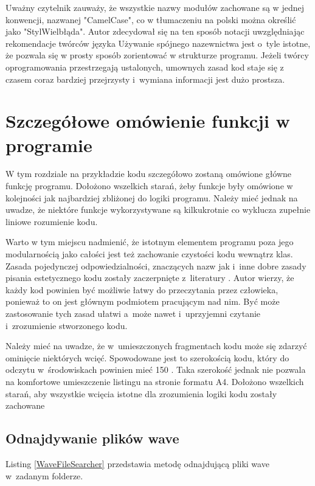 \documentclass[eng,printmode]{mgr}
\begin{document}
Uważny czytelnik zauważy, że wszystkie nazwy modułów zachowane są w jednej konwencji, nazwanej "CamelCase", co w tłumaczeniu na polski można określić jako "StylWielbłąda". Autor zdecydował się na ten sposób notacji uwzględniając rekomendacje twórców języka \cite{PEP8}Używanie spójnego nazewnictwa jest o~tyle istotne, że pozwala się w prosty sposób zorientować w strukturze programu. Jeżeli twórcy oprogramowania przestrzegają ustalonych, umownych zasad kod staje się z czasem coraz bardziej przejrzysty i~wymiana informacji jest dużo prostsza. 

\chapter{Szczegółowe omówienie funkcji w programie} \label{szczegolowe_omowienie}
W tym rozdziale na przykładzie kodu szczegółowo zostaną omówione główne funkcję programu. Dołożono wszelkich starań, żeby funkcje były omówione w kolejności jak najbardziej zbliżonej do logiki programu. Należy mieć jednak na uwadze, że niektóre funkcje wykorzystywane są kilkukrotnie co wyklucza zupełnie liniowe rozumienie kodu.

Warto w tym miejscu nadmienić, że istotnym elementem programu poza jego modularnością jako całości jest też zachowanie czystości kodu wewnątrz klas. Zasada pojedynczej odpowiedzialności, znaczących nazw jak i~inne dobre zasady pisania estetycznego kodu zostały zaczerpnięte z~literatury \cite{Czysty_kod}. Autor wierzy, że każdy kod powinien być możliwie łatwy do przeczytania przez człowieka, ponieważ to on jest głównym podmiotem pracującym nad nim. Być może zastosowanie tych zasad ułatwi a~może nawet i~uprzyjemni czytanie i~zrozumienie stworzonego kodu. 

Należy mieć na uwadze, że w~umieszczonych fragmentach kodu może się zdarzyć ominięcie niektórych wcięć. Spowodowane jest to szerokością kodu, który do odczytu w~środowiskach powinien mieć 150 \cite{PEP8}. Taka szerokość jednak nie pozwala na komfortowe umieszczenie listingu na stronie formatu A4. Dołożono wszelkich starań, aby wszystkie wcięcia istotne dla zrozumienia logiki kodu zostały zachowane
\section{Odnajdywanie plików wave}
Listing \ref{WaveFileSearcher} przedstawia metodę odnajdującą pliki wave w~zadanym folderze.
\end{document}
